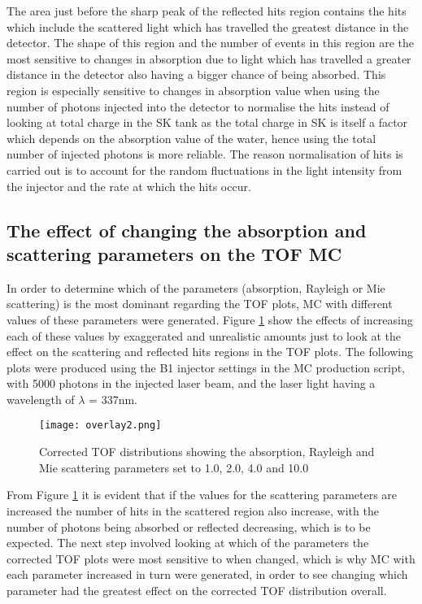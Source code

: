 \documentclass[11pt,oneside,a4paper]{article}
\begin{document}
The area just before the sharp peak of the reflected hits region contains the hits which include the scattered light which has travelled the greatest distance in the detector. The shape of this region and the number of events in this region are the most sensitive to changes in absorption due to light which has travelled a greater distance in the detector also having a bigger chance of being absorbed. This region is especially sensitive to changes in absorption value when using the number of photons injected into the detector to normalise the hits instead of looking at total charge in the SK tank as the total charge in SK is itself a factor which depends on the absorption value of the water, hence using the total number of injected photons is more reliable. The reason normalisation of hits is carried out is to account for the random fluctuations in the light intensity from the injector and the rate at which the hits occur.

	
\subsection{The effect of changing the absorption and scattering parameters on the TOF MC}
In order to determine which of the parameters (absorption, Rayleigh or Mie scattering) is the most dominant regarding the TOF plots, MC with different values of these parameters were generated. Figure \ref{fig:overlay2} show the effects of increasing each of these values by exaggerated and unrealistic amounts just to look at the effect on the scattering and reflected hits regions in the TOF plots. The following plots were produced using the B1 injector settings in the MC production script, with 5000 photons in the injected laser beam, and the laser light having a wavelength of $\lambda$ = 337nm.


\begin{figure}[htbp]
	\centering
	\texttt{[image: overlay2.png]}
	\caption{Corrected TOF distributions showing the absorption, Rayleigh and Mie scattering parameters set to 1.0, 2.0, 4.0 and 10.0}
	\label{fig:overlay2}
\end{figure}
	
	
From Figure \ref{fig:overlay2} it is evident that if the values for the scattering parameters are increased the number of hits in the scattered region also increase, with the number of photons being absorbed or reflected decreasing, which is to be expected. The next step involved looking at which of the parameters the corrected TOF plots were most sensitive to when changed, which is why MC with each parameter increased in turn were generated, in order to see changing which parameter had the greatest effect on the corrected TOF distribution overall.
	
\end{document}
